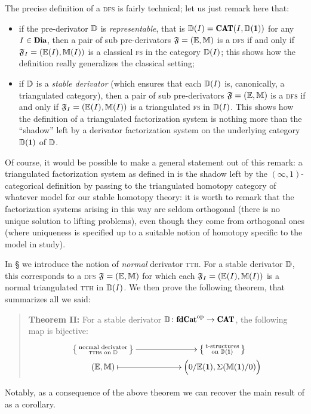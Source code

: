 The precise definition of a \textsc{dfs} is fairly technical; let us just remark here that:
\begin{itemize}
\item if the pre-derivator $\mathbb{D}$ is \emph{representable}, that is $\D(I)=\Cat(I,\D(\uno))$ for any $I\in \Dia$, then a pair of sub pre-derivators $\mathfrak{F}=(\mathbb E,\mathbb M)$ is a \textsc{dfs} if and only if $\mathfrak{F}_I=(\mathbb E(I),\mathbb M(I))$ is a classical \textsc{fs} in the category $\mathbb{D}(I)$; this shows how the definition really generalizes the classical setting;
\item if $\mathbb{D}$ is a \emph{stable derivator} (which ensures that each $\mathbb{D}(I)$ is, canonically, a triangulated category), then a pair of sub pre-derivators $\mathfrak{F}=(\mathbb E,\mathbb M)$ is a \textsc{dfs} if and only if $\mathfrak{F}_I=(\mathbb E(I),\mathbb M(I))$ is a triangulated \textsc{fs} in $\mathbb{D}(I)$. This shows how the definition of a triangulated factorization system is nothing more than the ``shadow'' left by a derivator factorization system on the underlying category $\D(\uno)$ of $\mathbb{D}$.
\end{itemize}
Of course, it would be possible to make a general statement out of this remark: a triangulated factorization system as defined in  is the shadow left by the $(\infty,1)$\hyp{}categorical definition by passing to the triangulated homotopy category of whatever model for our stable homotopy theory: it is worth to remark that the factorization systems arising in this way are seldom orthogonal (\ie there is no unique solution to lifting problems), even though they come from orthogonal ones (where uniqueness is specified up to a suitable notion of homotopy specific to the model in study).%

In § we introduce the notion of \emph{normal} derivator \textsc{tth}. For a stable derivator $\mathbb{D}$, this corresponds to a \textsc{dfs} $\mathfrak{F}=(\mathbb E,\mathbb M)$ for which each $\mathfrak{F}_I=(\mathbb E(I),\mathbb M(I))$ is a normal triangulated \textsc{tth} in $\mathbb{D}(I)$. We then prove the following theorem, that summarizes all we said:
\begin{quote}
\textbf{Theorem II:} For a stable derivator $\D\colon \fincat^\opp\to \Cat$, the following map is bijective:
\[
\xymatrix@R=0pt{
\left\{
{\begin{smallmatrix}
\text{normal derivator}\\
\text{\textsc{tth}s on }\D
\end{smallmatrix}}
\right\}
\ar[rr] &&
\left\{
{\begin{smallmatrix}
\text{$t$-structures}\\
\text{on }\D(\uno)
\end{smallmatrix}}
\right\}\\
(\mathbb E,\mathbb M) \ar@{|->}[rr]&& \Big(0/\mathbb E(\uno), \Sigma(\mathbb M(\uno)/0)\Big) 
}
\]
\end{quote}
Notably, as a consequence of the above theorem we can recover the main result of \cite{Fiorenza2014} as a corollary.

